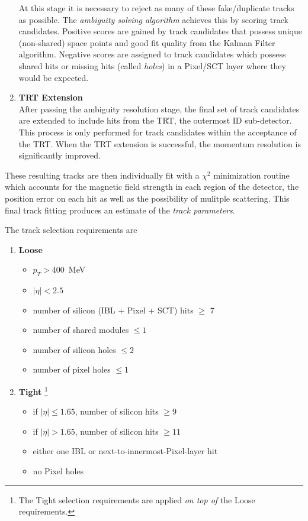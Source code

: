 \begin{enumerate}
        At this stage it is necessary to reject as many of these fake/duplicate tracks as possible.
        The \textit{ambiguity solving algorithm} achieves this by scoring track candidates.
        Positive scores are gained by track candidates that possess unique (non-shared) space points and good fit quality from the Kalman Filter algorithm.
        Negative scores are assigned to track candidates which possess shared hits or missing hits (called \textit{holes}) in a Pixel/SCT layer where they would be expected.
    \item \textbf{TRT Extension}\\
        After passing the ambiguity resolution stage, the final set of track candidates are extended to include hits from the TRT, the outermost ID sub-detector.
        This process is only performed for track candidates within the acceptance of the TRT.
        When the TRT extension is successful, the momentum resolution is significantly improved.
\end{enumerate}

These resulting tracks are then individually fit with a $\chi^2$ minimization routine \cite{Cornelissen:2008zza} which accounts for the magnetic field strength in each region of the detector, the position error on each hit as well as the possibility of mulitple scattering. This final track fitting produces an estimate of the \textit{track parameters}.

The track selection requirements are
\begin{enumerate}
    \itemsep0em 
    \item \textbf{Loose} \begin{itemize}
        \itemsep0em 
        \item $p_T > 400$\ MeV
        \item $|\eta| < 2.5$
        \item number of silicon (IBL + Pixel + SCT) hits $\geq$ 7
        \item number of shared modules $\leq 1$
        \item number of silicon holes $\leq 2$
        \item number of pixel holes $\leq 1$
    \end{itemize}
    
    \item \textbf{Tight} \footnote{The Tight selection requirements are applied \textit{on top of} the Loose requirements.} \begin{itemize}
        \itemsep0em 
        \item if $|\eta| \leq 1.65$, number of silicon hits $\geq 9$
        \item if $|\eta| > 1.65$, number of silicon hits $\geq 11$
        \item either one IBL or next-to-innermost-Pixel-layer hit
        \item no Pixel holes
    \end{itemize}
\end{enumerate}


